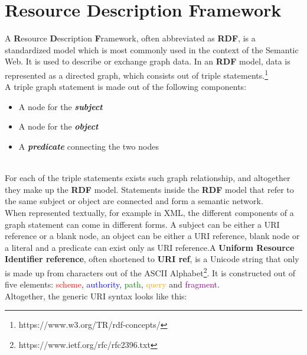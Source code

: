 \documentclass[english]{ttlab-qualify}
\begin{document}
\section{Resource Description Framework}
A \textbf{R}esource \textbf{D}escription \textbf{F}ramework, often abbreviated as \textbf{RDF}, is a standardized model which is most commonly used in the context of the Semantic Web. It is used to describe or exchange graph data. In an \textbf{RDF} model, data is represented as a directed graph, which consists out of triple statements.\footnote[4]{https://www.w3.org/TR/rdf-concepts/}
\\
A triple graph statement is made out of the following components:
\vspace{0.3cm}\\
\begin{minipage}{.5\textwidth}
    \begin{itemize}
        \item A node for the \textit{\textbf{subject}}
        \item A node for the \textit{\textbf{object}}
        \item A \textit{\textbf{predicate}} connecting the two nodes
    \end{itemize} 
\end{minipage}
\begin{minipage}{.5\textwidth}
\end{minipage}
\vspace{0.3cm}\\
For each of the triple statements exists such graph relationship, and altogether they make up the \textbf{RDF} model. Statements inside the \textbf{RDF} model that refer to the same subject or object are connected and form a semantic network.
\vspace{0.3cm}\\
When represented textually, for example in XML, the different components of a graph statement can come in different forms. A subject can be either a URI reference or a blank node, an object can be either a URI reference, blank node or a literal and a predicate can exist only as URI reference.\footnotemark[4] A \textbf{Uniform Resource Identifier reference}, often shortened to \textbf{URI ref}, is a Unicode string that only is made up from characters out of the ASCII Alphabet\footnote[5]{https://www.ietf.org/rfc/rfc2396.txt}. It is constructed out of five elements: \textcolor{red}{scheme}, \textcolor{blue}{authority}, \textcolor{green}{path}, \textcolor{orange}{query} and \textcolor{purple}{fragment}.\\ Altogether, the generic URI syntax looks like this:
\end{document}
